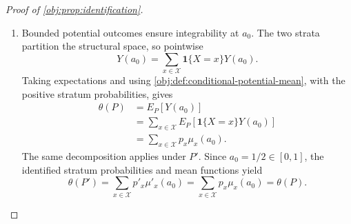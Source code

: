 \documentclass[11pt]{article}
\begin{document}
\begin{proof}[Proof of \cref{obj:prop:identification}]
\begin{enumerate}
The lower design envelope makes \(g_x(t)>0\) for Lebesgue-almost every \(t\) in the full latent interval: the possible exceptional point \(t=0\) is null. Thus, for every Borel \(B\subseteq\mathbb R\),
\[
\nu_{0x}(B)=\int_{B\cap[-1/2,1/2]}g_x(t)\,dt=0
\quad\Longrightarrow\quad
\int_{B\cap[-1/2,1/2]}1\,dt=0.
\]
Indeed, a zero integral of the nonnegative density forces it to vanish almost everywhere on that set, and its almost-everywhere positivity forces the set to be Lebesgue-null. The mean equality consequently transfers to Lebesgue-almost every centered dose:
\[
\mu_x(t+a_0)=\mu'_x(t+a_0)
\qquad
\text{for Lebesgue-almost every }t\in[-1/2,1/2].
\]

For \(t,t'\in[-1/2,1/2]\), the two Hölder bounds give
\[
\begin{aligned}
|\mu_x(t+a_0)-\mu_x(t'+a_0)|&\le|t-t'|^\beta,\\
|\mu'_x(t+a_0)-\mu'_x(t'+a_0)|&\le|t-t'|^\beta.
\end{aligned}
\]
Since \(\beta>0\), both centered mean functions are continuous on the closed interval. If they differed at any point, continuity would preserve their difference on a relative neighborhood of that point. Every such neighborhood has positive Lebesgue measure, including at either endpoint, contradicting their almost-everywhere agreement. Hence
\[
\mu_x(t+a_0)=\mu'_x(t+a_0)
\qquad
\text{for every }t\in[-1/2,1/2].
\]
For every \(a\in[0,1]\),
\[
a-a_0\in[-1/2,1/2],
\qquad
(a-a_0)+a_0=a.
\]
Substitution therefore proves
\[
\mu_x(a)=\mu'_x(a)
\qquad
\text{for every }a\in[0,1].
\]
Since \(x\) was arbitrary, all the preceding conclusions hold in both strata.

\item Bounded potential outcomes ensure integrability at \(a_0\). The two strata partition the structural space, so pointwise
\[
Y(a_0)=\sum_{x\in\mathcal X}\mathbf1\{X=x\}Y(a_0).
\]
Taking expectations and using \cref{obj:def:conditional-potential-mean}, with the positive stratum probabilities, gives
\[
\begin{aligned}
\theta(P)
&=E_P[Y(a_0)]\\
&=\sum_{x\in\mathcal X}E_P[\mathbf1\{X=x\}Y(a_0)]\\
&=\sum_{x\in\mathcal X}p_x\mu_x(a_0).
\end{aligned}
\]
The same decomposition applies under \(P'\). Since \(a_0=1/2\in[0,1]\), the identified stratum probabilities and mean functions yield
\[
\theta(P')
=\sum_{x\in\mathcal X}p'_x\mu'_x(a_0)
=\sum_{x\in\mathcal X}p_x\mu_x(a_0)
=\theta(P).
\]
\end{enumerate}
\end{proof}
\end{document}
